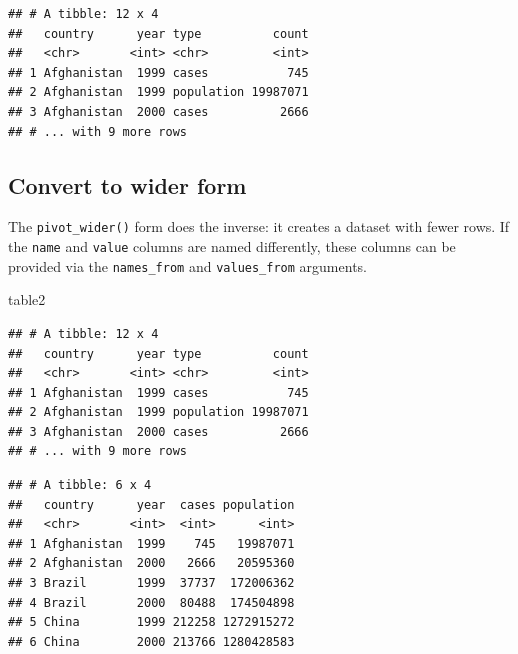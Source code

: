 \documentclass[]{book}
\newenvironment{Shaded}{}{}
\newcommand{\DataTypeTok}[1]{#1}
\newcommand{\KeywordTok}[1]{\textcolor[rgb]{0.00,0.00,1.00}{#1}}
\newcommand{\NormalTok}[1]{#1}
\newcommand{\OperatorTok}[1]{#1}
\newcommand{\StringTok}[1]{\textcolor[rgb]{0.00,0.50,0.50}{#1}}
\begin{document}
\begin{verbatim}
## # A tibble: 12 x 4
##   country      year type          count
##   <chr>       <int> <chr>         <int>
## 1 Afghanistan  1999 cases           745
## 2 Afghanistan  1999 population 19987071
## 3 Afghanistan  2000 cases          2666
## # ... with 9 more rows
\end{verbatim}

\hypertarget{convert-to-wider-form}{%
\subsection{Convert to wider form}\label{convert-to-wider-form}}

The \texttt{pivot\_wider()} form does the inverse: it creates a dataset with fewer rows.
If the \texttt{name} and \texttt{value} columns are named differently, these columns can be provided via the \texttt{names\_from} and \texttt{values\_from} arguments.

\begin{Shaded}
\begin{Highlighting}[]
\NormalTok{table2}
\end{Highlighting}
\end{Shaded}

\begin{verbatim}
## # A tibble: 12 x 4
##   country      year type          count
##   <chr>       <int> <chr>         <int>
## 1 Afghanistan  1999 cases           745
## 2 Afghanistan  1999 population 19987071
## 3 Afghanistan  2000 cases          2666
## # ... with 9 more rows
\end{verbatim}

\begin{Shaded}
\end{Shaded}

\begin{verbatim}
## # A tibble: 6 x 4
##   country      year  cases population
##   <chr>       <int>  <int>      <int>
## 1 Afghanistan  1999    745   19987071
## 2 Afghanistan  2000   2666   20595360
## 3 Brazil       1999  37737  172006362
## 4 Brazil       2000  80488  174504898
## 5 China        1999 212258 1272915272
## 6 China        2000 213766 1280428583
\end{verbatim}
\end{document}

